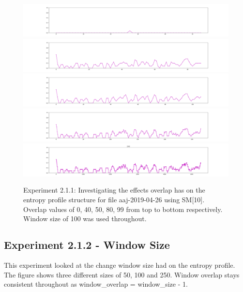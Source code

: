 \begin{figure}[b]
\begin{center}
	\includegraphics[scale=0.15]{src/main-matter/results/experiment-age/entropy/[10]/Overlap(0)}
	\includegraphics[scale=0.15]{src/main-matter/results/experiment-age/entropy/[10]/Overlap(40)}
	\includegraphics[scale=0.15]{src/main-matter/results/experiment-age/entropy/[10]/Overlap(50)}
	\includegraphics[scale=0.15]{src/main-matter/results/experiment-age/entropy/[10]/Overlap(80)}
	\includegraphics[scale=0.15]{src/main-matter/results/experiment-age/entropy/[10]/Overlap(99)}
\caption{Experiment 2.1.1: Investigating the effects overlap has on the entropy profile structure for file aaj-2019-04-26 using SM[10]. Overlap values of 0, 40, 50, 80, 99 from top to bottom respectively. Window size of 100 was used throughout.}
\label{default}
\end{center}
\end{figure}






\subsection{Experiment 2.1.2 - Window Size}
This experiment looked at the change window size had on the entropy profile. The figure shows three different sizes of 50, 100 and 250. Window overlap stays consistent throughout as window\_overlap = window\_size - 1.


